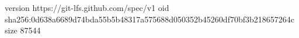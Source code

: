 version https://git-lfs.github.com/spec/v1
oid sha256:0d638a6689d74bda55b5b48317a575688d050352b45260df70bf3b218657264c
size 87544
